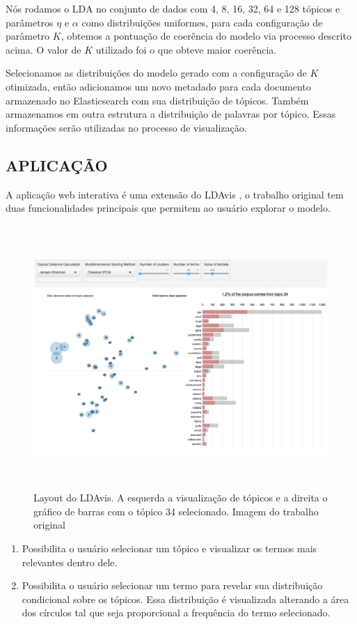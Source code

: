 \documentclass[12pt,a4paper]{article}
\begin{document}
Nós rodamos o LDA no conjunto de dados com 4, 8, 16, 32, 64 e 128 tópicos e parâmetros $\eta$ e $\alpha$ como distribuições uniformes, para cada configuração de parâmetro $K$,
 obtemos a pontuação de coerência do modelo via processo descrito acima. O valor de $K$ utilizado foi o que obteve maior coerência.

Selecionamos as distribuições do modelo gerado com a configuração de $K$ otimizada, então adicionamos um novo metadado para cada documento armazenado no Elasticsearch com sua distribuição de tópicos.
 Também armazenamos em outra estrutura a distribuição de palavras por tópico. Essas informações serão utilizadas no processo de visualização.

\subsection{APLICAÇÃO}
A aplicação web interativa é uma extensão do LDAvis \cite{sievert2014ldavis}, o trabalho original tem duas funcionalidades principais
que permitem ao usuário explorar o modelo.

\begin{figure}[H]
	\centering
    \includegraphics[height=10cm]{images/figure_4.png}
    \caption{Layout do LDAvis. A esquerda a visualização de tópicos e a direita o gráfico de barras com o tópico 34 selecionado. Imagem do trabalho original \cite{sievert2014ldavis}}
\end{figure}


\begin{enumerate}
  \item Possibilita o usuário selecionar um tópico e visualizar os termos mais relevantes dentro dele.
  \item Possibilita o usuário selecionar um termo para revelar sua distribuição condicional sobre os tópicos. Essa distribuição
  é visualizada alterando a área dos círculos tal que seja proporcional a frequência do termo selecionado.
\end{enumerate}
\end{document}
